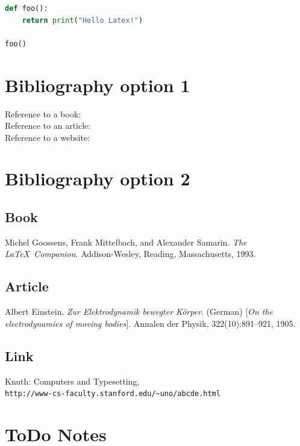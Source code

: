 \documentclass[12pt]{article}
\begin{document}
\begin{lstlisting}[language=Python, caption=Python example]
def foo():
    return print("Hello Latex!")

foo()
\end{lstlisting}


\section{Bibliography option 1}

Reference to a book: \cite{latexcompanion} \\
Reference to an article: \cite{einstein} \\
Reference to a website: \cite{knuthwebsite} \\




\section{Bibliography option 2}

\begin{thebibliography}{1}
\subsection{Book}
Michel Goossens, Frank Mittelbach, and Alexander Samarin. 
\textit{The \LaTeX\ Companion}. 
Addison-Wesley, Reading, Massachusetts, 1993.

\subsection{Article}
Albert Einstein. 
\textit{Zur Elektrodynamik bewegter K{\"o}rper}. (German) 
[\textit{On the electrodynamics of moving bodies}]. 
Annalen der Physik, 322(10):891–921, 1905.

\subsection{Link}
Knuth: Computers and Typesetting,
\\\texttt{http://www-cs-faculty.stanford.edu/\~{}uno/abcde.html}
\end{thebibliography}


\section{ToDo Notes}
\end{document}
